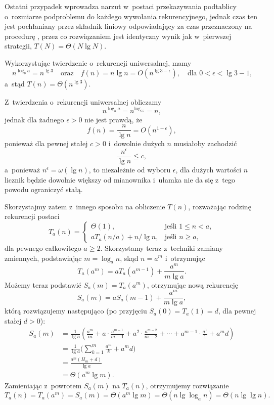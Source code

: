 Ostatni przypadek wprowadza narzut w~postaci przekazywania podtablicy o~rozmiarze podproblemu do każdego wywołania rekurencyjnego, jednak czas ten jest pochłaniany przez składnik liniowy odpowiadający za czas przeznaczony na procedurę , przez co rozwiązaniem jest identyczny wynik jak w~pierwszej strategii, $T(N)=\Theta(N\lg N)$.


\subproblem %
Wykorzystując twierdzenie o~rekurencji uniwersalnej, mamy
\[
	n^{\log_ba} = n^{\lg3} \quad\text{oraz}\quad f(n) = n\lg n = O(n^{\lg3-\epsilon}), \quad\text{dla $0<\epsilon<\lg3-1$,}
\]
a~stąd $T(n)=\Theta(n^{\lg3})$.

\subproblem %
Z~twierdzenia o~rekurencji uniwersalnej obliczamy
\[
	n^{\log_ba} = n^{\log_55} = n,
\]
jednak dla żadnego $\epsilon>0$ nie jest prawdą, że
\[
	f(n) = \frac{n}{\lg n} = O(n^{1-\epsilon}),
\]
ponieważ dla pewnej stałej $c>0$ i~dowolnie dużych $n$ musiałoby zachodzić
\[
	\frac{n^\epsilon}{\lg n} \le c,
\]
a~ponieważ $n^\epsilon=\omega(\lg n)$, to niezależnie od wyboru $\epsilon$, dla dużych wartości $n$ licznik będzie dowolnie większy od mianownika i~ułamka nie da się z~tego powodu ograniczyć stałą.

Skorzystajmy zatem z~innego sposobu na obliczenie $T(n)$, rozważając rodzinę rekurencji postaci
\[
	T_a(n) = \begin{cases}
		\Theta(1), & \text{jeśli $1\le n<a$}, \\
		aT_a(n/a)+n/\!\lg n, & \text{jeśli $n\ge a$},
	\end{cases}
\]
dla pewnego całkowitego $a\ge2$. Skorzystamy teraz z~techniki zamiany zmiennych, podstawiając $m=\log_an$, skąd $n=a^m$ i~otrzymując
\[
	T_a(a^m) = aT_a(a^{m-1})+\frac{a^m}{m\lg a}.
\]
Możemy teraz podstawić $S_a(m)=T_a(a^m)$, otrzymując nową rekurencję
\[
	S_a(m) = aS_a(m-1)+\frac{a^m}{m\lg a},
\]
którą rozwiązujemy następująco (po przyjęciu $S_a(0)=T_a(1)=d$, dla pewnej stałej $d>0$):
\begin{align*}
	S_a(m) &= \frac{1}{\lg a}\left(\frac{a^m}{m}+a\cdot\frac{a^{m-1}}{m-1}+a^2\cdot\frac{a^{m-2}}{m-2}+\cdots+a^{m-1}\cdot\frac{a^1}{1}+a^md\right) \\[1mm]
	&= \frac{1}{\lg a}\biggl(\sum_{k=1}^m\frac{a^m}{k}+a^md\biggr) \\[1mm]
	&= \frac{a^m(H_m+d)}{\lg a} \\[1mm]
	&= \Theta(a^m\lg m).
\end{align*}
Zamieniając z~powrotem $S_a(m)$ na $T_a(n)$, otrzymujemy rozwiązanie
\[
	T_a(n) = T_a(a^m) = S_a(m) = \Theta(a^m\lg m) = \Theta(n\lg\log_a n) = \Theta(n\lg\lg n).
\]

